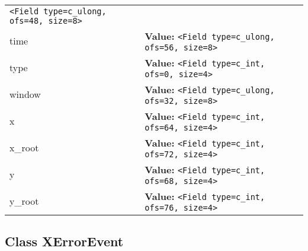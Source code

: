 \begin{longtable}{|p{\varnamewidth}|p{\vardescrwidth}|l}
{\tt {\textless}Field type=c\_ulong, ofs=48, size=8{\textgreater}}&\\
\cline{1-2}
\raggedright t\-i\-m\-e\- & \raggedright \textbf{Value:} 
{\tt {\textless}Field type=c\_ulong, ofs=56, size=8{\textgreater}}&\\
\cline{1-2}
\raggedright t\-y\-p\-e\- & \raggedright \textbf{Value:} 
{\tt {\textless}Field type=c\_int, ofs=0, size=4{\textgreater}}&\\
\cline{1-2}
\raggedright w\-i\-n\-d\-o\-w\- & \raggedright \textbf{Value:} 
{\tt {\textless}Field type=c\_ulong, ofs=32, size=8{\textgreater}}&\\
\cline{1-2}
\raggedright x\- & \raggedright \textbf{Value:} 
{\tt {\textless}Field type=c\_int, ofs=64, size=4{\textgreater}}&\\
\cline{1-2}
\raggedright x\-\_\-r\-o\-o\-t\- & \raggedright \textbf{Value:} 
{\tt {\textless}Field type=c\_int, ofs=72, size=4{\textgreater}}&\\
\cline{1-2}
\raggedright y\- & \raggedright \textbf{Value:} 
{\tt {\textless}Field type=c\_int, ofs=68, size=4{\textgreater}}&\\
\cline{1-2}
\raggedright y\-\_\-r\-o\-o\-t\- & \raggedright \textbf{Value:} 
{\tt {\textless}Field type=c\_int, ofs=76, size=4{\textgreater}}&\\
\cline{1-2}
\end{longtable}



\subsection{Class XErrorEvent}


